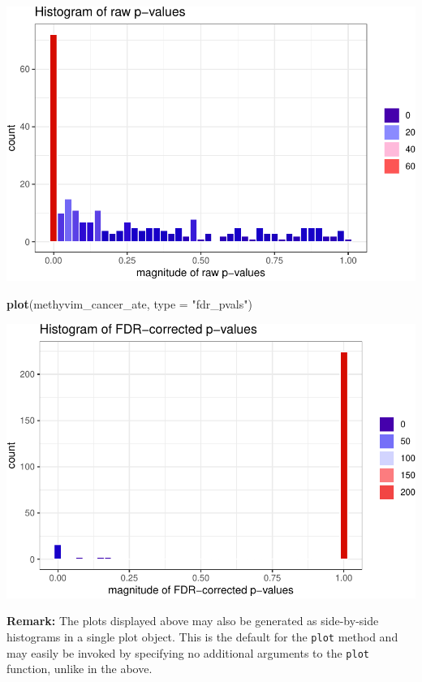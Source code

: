 \documentclass[9pt,a4paper,]{extarticle}
\newenvironment{Shaded}{\begin{snugshade}}{\end{snugshade}}
\newcommand{\DataTypeTok}[1]{\textcolor[rgb]{0.13,0.29,0.53}{#1}}
\newcommand{\KeywordTok}[1]{\textcolor[rgb]{0.13,0.29,0.53}{\textbf{#1}}}
\newcommand{\NormalTok}[1]{#1}
\newcommand{\StringTok}[1]{\textcolor[rgb]{0.31,0.60,0.02}{#1}}
\theoremstyle{definition}
\theoremstyle{definition}
\theoremstyle{definition}
\theoremstyle{remark}
\begin{document}
\begin{center}\includegraphics{paper_BiocF1000_files/figure-latex/methyvim-pvals-raw-1} \end{center}

\begin{Shaded}
\begin{Highlighting}[]
\KeywordTok{plot}\NormalTok{(methyvim_cancer_ate, }\DataTypeTok{type =} \StringTok{"fdr_pvals"}\NormalTok{)}
\end{Highlighting}
\end{Shaded}

\begin{center}\includegraphics{paper_BiocF1000_files/figure-latex/methyvim-pvals-fdr-1} \end{center}

\textbf{Remark:} The plots displayed above may also be generated as side-by-side
histograms in a single plot object. This is the default for the \texttt{plot} method
and may easily be invoked by specifying no additional arguments to the \texttt{plot}
function, unlike in the above.
\end{document}
